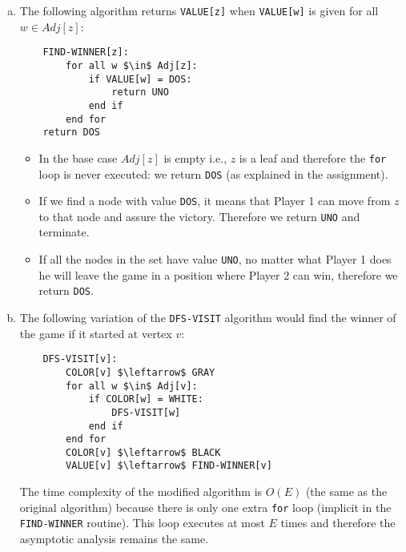 \documentclass{article}
\begin{document}
\begin{enumerate}[1.]
\begin{enumerate}[(a)]
        \item The following algorithm returns \texttt{VALUE[z]} when \texttt{VALUE[w]} is given for all $w \in Adj[z]$:
\begin{lstlisting}
    FIND-WINNER[z]:
        for all w $\in$ Adj[z]:
            if VALUE[w] = DOS:
                return UNO
            end if
        end for
    return DOS
\end{lstlisting}
        \begin{itemize}
            \item In the base case $Adj[z]$ is empty i.e., $z$ is a leaf and therefore the \texttt{for} loop is never executed: we return \texttt{DOS} (as explained in the assignment).
            \item If we find a node with value \texttt{DOS}, it means that Player 1 can move from $z$ to that node and assure the victory. Therefore we return \texttt{UNO} and terminate.
            \item If all the nodes in the set have value \texttt{UNO}, no matter what Player 1 does he will leave the game in a position where Player 2 can win, therefore we return \texttt{DOS}.
        \end{itemize}
        
        \item The following variation of the \texttt{DFS-VISIT} algorithm would find the winner of the game if it started at vertex $v$:
\begin{lstlisting}
    DFS-VISIT[v]:
        COLOR[v] $\leftarrow$ GRAY
        for all w $\in$ Adj[v]:
            if COLOR[w] = WHITE:
                DFS-VISIT[w]
            end if
        end for
        COLOR[v] $\leftarrow$ BLACK
        VALUE[v] $\leftarrow$ FIND-WINNER[v]
\end{lstlisting}
        The time complexity of the modified algorithm is $O(E)$ (the same as the original algorithm) because there is only one extra \texttt{for} loop (implicit in the \texttt{FIND-WINNER} routine). This loop executes at most $E$ times and therefore the asymptotic analysis remains the same.
        
    \end{enumerate}
\end{enumerate}
\end{document}
